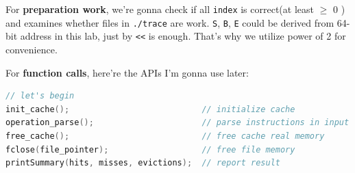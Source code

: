 \documentclass{article}
\begin{document}
For \textbf{preparation work}, we're gonna check if all \lstinline|index| is correct(at least $\geq$ 0 ) and examines whether files in \lstinline|./trace| are work. \lstinline|S|, \lstinline|B|, \lstinline|E| could be derived from 64-bit address in this lab, just by \lstinline|<<| is enough. That's why we utilize power of 2 for convenience. 

For \textbf{function calls}, here're the APIs I'm gonna use later:
\begin{lstlisting}[language=c]
// let's begin
init_cache();                           // initialize cache
operation_parse();                      // parse instructions in input file
free_cache();                           // free cache real memory
fclose(file_pointer);                   // free file memory
printSummary(hits, misses, evictions);  // report result
\end{lstlisting}
\end{document}
